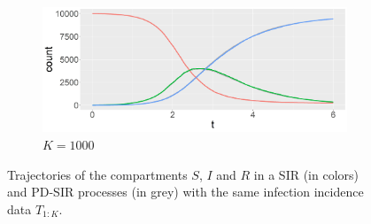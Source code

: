 \documentclass[11pt]{article}
\begin{document}
\begin{figure}
\begin{subfigure}[b]{0.49\textwidth}
			\centering
			\includegraphics[width=\textwidth]{E2_K1000}
			\caption{$K = 1000$}
			\label{fig:comparison_RD_SIR_K1000}
		\end{subfigure}
		\caption{Trajectories of the compartments $S$, $I$ and $R$ in a SIR (in colors) and PD-SIR processes (in grey) with the same infection incidence data $T_{1:K}$.}
		\label{fig:comparison}
	\end{figure}
	\smallskip
	
\end{document}
